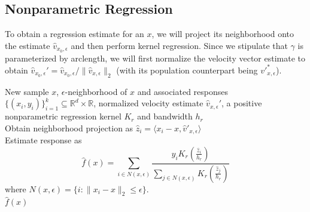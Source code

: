 \documentclass[11pt]{article}
\begin{document}
\subsection{Nonparametric Regression}

To obtain a regression estimate for an $x$, we will project its neighborhood onto the estimate $\hat{v}_{x_0, \epsilon}$ and then perform kernel regression. Since we stipulate that $\gamma$ is parameterized by arclength, we will first normalize the velocity vector estimate to obtain $\hat{v}_{x_0, \epsilon}' = \hat{v}_{x_0, \epsilon}/\|\hat{v}_{x, \epsilon}\|_2$ (with its population counterpart being $v'^{*}_{x, \epsilon}$). 

\begin{algorithm}[H]
    \begin{algorithmic}[1]
        \caption{Locally Linear Single Index Regression}
        \label{alg: LLR}
        \Require New sample $x$, $\epsilon$-neighborhood of $x$ and associated responses $\{(x_i, y_i)\}_{i=1}^k \subseteq \mathbb{R}^d \times \mathbb{R}$, normalized velocity estimate $\hat{v}_{x, \epsilon}'$, a positive nonparametric regression kernel $K_r$ and bandwidth $h_r$\\
        Obtain neighborhood projection as $\hat{z}_i = \langle x_i - x, \hat{v}'_{x, \epsilon} \rangle$ \\
        Estimate response as 
        \begin{equation} \label{eq: kernel regressor}
            \hat{f}(x) = \sum_{i \in N(x, \epsilon)}\frac{y_iK_r(\frac{\hat{z}_i}{h_r})}{\sum_{j\in N(x, \epsilon)}K_r(\frac{\hat{z}_j}{h_r})}
        \end{equation}
        where $N(x, \epsilon) = \{i : \|x_i - x\|_2 \leq \epsilon\}$. \\
        \Return $\hat{f}(x)$
    \end{algorithmic}
\end{algorithm}
\end{document}
